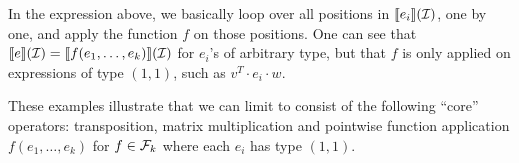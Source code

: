 In the expression above, we basically loop over all positions in $\llbracket e_i \rrbracket(\mathcal{I})$, one by one, and apply the function $f$ on those positions.  One can see that $\llbracket e \rrbracket(\mathcal{I})=\llbracket f(e_1,\ldots,e_k) \rrbracket(\mathcal{I})$ for $e_i$'s of arbitrary type, but that $f$ is only
applied on expressions of type $(1,1)$, such as $v^T\cdot e_i\cdot w$. 
%
%
%
%
%

These examples illustrate that we can limit \langfor to consist of the following ``core'' operators: transposition, matrix multiplication and pointwise function application $f(e_1,\ldots,e_k)$ for $f\in\mathcal{F}_k$ where each $e_i$
has type $(1,1)$. 

